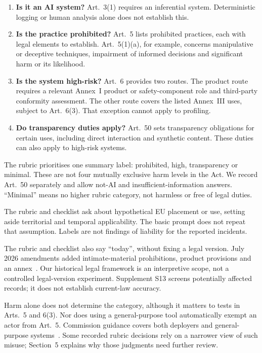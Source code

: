 \documentclass[sigconf,natbib=false,language=english]{acmart}
\begin{document}
\begin{enumerate}
\item \textbf{Is it an AI system?} Art.~3(1) requires an inferential system. Deterministic logging or human analysis alone does not establish this.
\item \textbf{Is the practice prohibited?} Art.~5 lists prohibited practices, each with legal elements to establish. Art.~5(1)(a), for example, concerns manipulative or deceptive techniques, impairment of informed decisions and significant harm or its likelihood.
\item \textbf{Is the system high-risk?} Art.~6 provides two routes. The product route requires a relevant Annex~I product or safety-component role and third-party conformity assessment. The other route covers the listed Annex~III uses, subject to Art.~6(3). That exception cannot apply to profiling.
\item \textbf{Do transparency duties apply?} Art.~50 sets transparency obligations for certain uses, including direct interaction and synthetic content. These duties can also apply to high-risk systems.
\end{enumerate}

The rubric prioritises one summary label: prohibited, high, transparency or minimal. These are not four mutually exclusive harm levels in the Act. We record Art.~50 separately and allow not-AI and insufficient-information answers. ``Minimal'' means no higher rubric category, not harmless or free of legal duties.

The rubric and checklist ask about hypothetical EU placement or use, setting aside territorial and temporal applicability. The basic prompt does not repeat that assumption. Labels are not findings of liability for the reported incidents.

The rubric and checklist also say ``today'', without fixing a legal version. July 2026 amendments added intimate-material prohibitions, product provisions and an annex~\cite{omnibus2026}. Our historical legal framework is an interpretive scope, not a controlled legal-version experiment. Supplement S13 screens potentially affected records; it does not establish current-law accuracy.

Harm alone does not determine the category, although it matters to tests in Arts.~5 and 6(3). Nor does using a general-purpose tool automatically exempt an actor from Art.~5. Commission guidance covers both deployers and general-purpose systems~\cite{commission2025}. Some recorded rubric decisions rely on a narrower view of such misuse; Section~5 explains why those judgments need further review.
\end{document}
